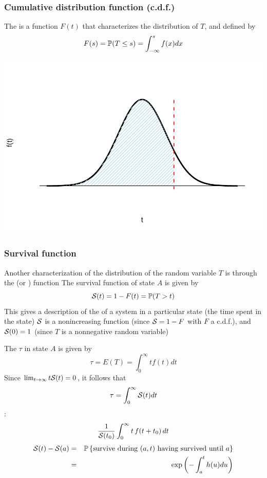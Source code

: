 \documentclass[aspectratio=169]{beamer}\usepackage[]{graphicx}\usepackage[]{xcolor}
\begin{document}
\begin{frame}\frametitle{Cumulative distribution function (c.d.f.)}
\begin{minipage}{0.4\textwidth}
The  is a function $F(t)$ that characterizes the distribution of $T$, and defined by
\[
F(s)=\IP(T\leq s)=\int_{-\infty}^sf(x)dx
\]
\end{minipage}
\begin{minipage}{0.59\textwidth}
\includegraphics[width=\textwidth]{FIGS/L24-distrib_minf_b-1.pdf}
\end{minipage}
\end{frame}

\begin{frame}\frametitle{Survival function}
Another characterization of the distribution of the random variable $T$ is through the  (or ) function
\vfill
The survival function of state $A$ is given by 
\begin{equation}
  \S(t)=1-F(t)=\IP(T>t)
  \label{eq:survival}
\end{equation}
This gives a description of the  of a
system in a particular state (the time spent in the state)
\vfill
$\S$ is a nonincreasing function (since $\S=1-F$
with $F$ a c.d.f.), and
$\S(0)=1$ (since $T$ is a nonnegative random variable)
\end{frame}




\begin{frame}
The  $\tau$ in state $A$ is given by
\[
\tau=E(T)=\int_0^\infty tf(t)dt
\]
Since $\lim_{t\to\infty}t\S(t)=0$, it follows that 
\[
\tau=\int_0^\infty \S(t)dt
\]
\vfill
{}:
\[
\frac{1}{\S(t_0)} \int_0^{\infty} t\,f(t+t_0)\,dt 
\]
\vfill
\begin{eqnarray*}
\S(t)-\S(a)&=&\IP\left\{\textrm{survive during }
 (a,t)\textrm{ having survived until }a\right\} \\
&=& \exp\left(-\int_a^t h(u)du\right)
\end{eqnarray*}
\end{frame}
\end{document}
